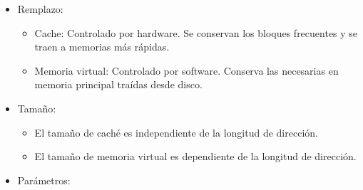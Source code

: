 \documentclass[12pt, twoside, openright]{report} %
\begin{document}
    \begin{itemize}
    
    \item
      Remplazo:

      \begin{itemize}
      
      \item
        Cache: Controlado por hardware. Se conservan los bloques
        frecuentes y se traen a memorias más rápidas.
      \item
        Memoria virtual: Controlado por software. Conserva las
        necesarias en memoria principal traídas desde disco.
      \end{itemize}
    \item
      Tamaño:

      \begin{itemize}
      
      \item
        El tamaño de caché es independiente de la longitud de dirección.
      \item
        El tamaño de memoria virtual es dependiente de la longitud de
        dirección.
      \end{itemize}
    \item
      Parámetros:


\end{itemize}
\end{document}
